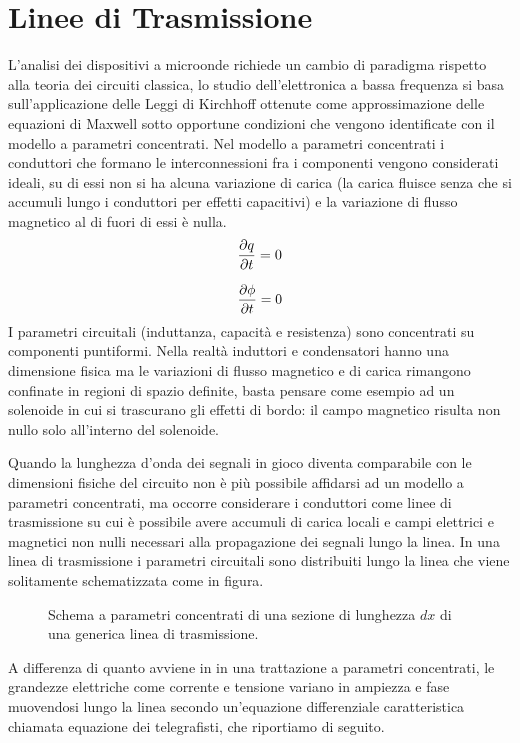 \documentclass[12pt,oneside]{book}
\begin{document}
\section{Linee di Trasmissione}
L'analisi dei dispositivi a microonde richiede un cambio di paradigma rispetto alla teoria dei circuiti classica, lo studio dell'elettronica a bassa frequenza si basa sull'applicazione delle Leggi di Kirchhoff ottenute come approssimazione delle equazioni di Maxwell sotto opportune condizioni che vengono identificate con il modello a parametri concentrati.
Nel modello a parametri concentrati i conduttori che formano le interconnessioni fra i componenti vengono considerati ideali, su di essi non si ha alcuna variazione di carica (la carica fluisce senza che si accumuli lungo i conduttori per effetti capacitivi) e la variazione di flusso magnetico al di fuori di essi è nulla.
\begin{equation}
    \pdv{q}{t}=0
\end{equation}

\begin{equation}
    \pdv{\phi}{t}=0
\end{equation}
I parametri circuitali (induttanza, capacità e resistenza) sono concentrati su componenti puntiformi. Nella realtà induttori e condensatori hanno una dimensione fisica ma le variazioni di flusso magnetico e di carica rimangono confinate in regioni di spazio definite, basta pensare come esempio ad un solenoide in cui si trascurano gli effetti di bordo: il campo magnetico risulta non nullo solo all'interno del solenoide.

Quando la lunghezza d'onda dei segnali in gioco diventa comparabile con le dimensioni fisiche del circuito non è più possibile affidarsi ad un modello a parametri concentrati, ma occorre considerare i conduttori come linee di trasmissione su cui è possibile avere accumuli di carica locali e campi elettrici e magnetici non nulli necessari alla propagazione dei segnali lungo la linea.
In una linea di trasmissione i parametri circuitali sono distribuiti lungo la linea che viene solitamente schematizzata come in figura.
\begin{figure}[!htbp]
    \centering
    
    \caption{Schema a parametri concentrati di una sezione di lunghezza $dx$ di una generica linea di trasmissione.}
\end{figure} 
A differenza di quanto avviene in in una trattazione a parametri concentrati, le grandezze elettriche come corrente e tensione variano in ampiezza e fase muovendosi lungo la linea secondo un'equazione differenziale caratteristica chiamata equazione dei telegrafisti, che riportiamo di seguito.
\end{document}
